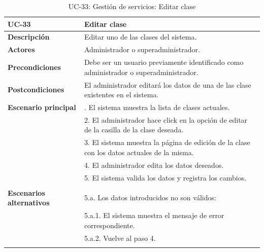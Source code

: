 \begin{table}[H]
  \begin{center}
    \begin{tabularx}{16.4cm}{|l|X|}
      \hline
      \textbf{UC-33} & \textbf{Editar clase}\\
      \hline
      \textbf{Descripción} & Editar uno de las clases del sistema.\\
      \hline
      \textbf{Actores} & Administrador o superadministrador.\\
      \hline
      \textbf{Precondiciones} & Debe ser un usuario previamente identificado como administrador o superadministrador.\\
      \hline
      \textbf{Postcondiciones} & El administrador editará los datos de una de las clase existentes en el sistema.\\
      \hline
      \textbf{Escenario principal} & \smallskip 1. El sistema muestra la lista de clases actuales.\\
      & 2. El administrador hace click en la opción de editar de la casilla de la clase deseada.\\
      & 3. El sistema muestra la página de edición de la clase con los datos actuales de la misma.\\
      & 4. El administrador edita los datos deseados.\\
      & 5. El sistema valida los datos y registra los cambios.\\
      & \\
      \hline
      \textbf{Escenarios alternativos} & \smallskip 5.a. Los datos introducidos no son válidos:\\
      & \hspace{0.3cm} 5.a.1. El sistema muestra el mensaje de error correspondiente.\\
      & \hspace{0.3cm} 5.a.2. Vuelve al paso 4.\\
      & \\
      \hline
    \end{tabularx}
    \caption{UC-33: Gestión de servicios: Editar clase}
    \label{tab:CU-editar-clase}
  \end{center}
\end{table}


